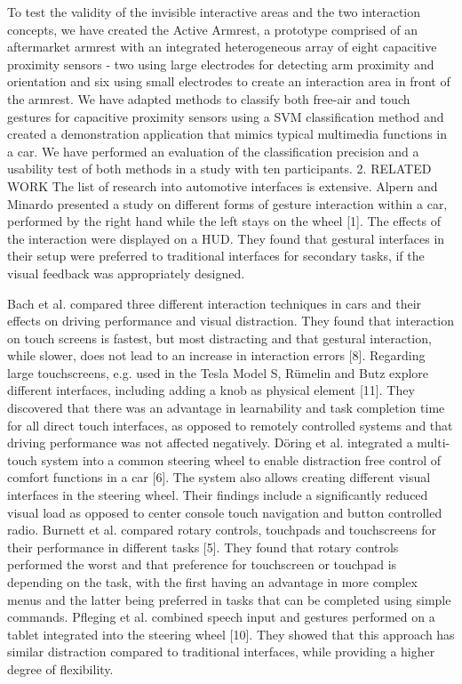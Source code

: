 To test the validity of the invisible interactive areas and the two interaction concepts, we have created the Active Armrest, a prototype comprised of an aftermarket armrest with an integrated heterogeneous array of eight capacitive proximity sensors - two using large electrodes for detecting arm proximity and orientation and six using small electrodes to create an interaction area in front of the armrest. We have adapted methods to classify both free-air and touch gestures for capacitive proximity sensors using a SVM classification method and created a demonstration application that mimics typical multimedia functions in a car. We have performed an evaluation of the classification precision and a usability test of both methods in a study with ten participants.
2.	RELATED WORK
The list of research into automotive interfaces is extensive. Alpern and Minardo presented a study on different forms of gesture interaction within a car, performed by the right hand while the left stays on the wheel [1]. The effects of the interaction were displayed on a HUD. They found that gestural interfaces in their setup were preferred to traditional interfaces for secondary tasks, if the visual feedback was appropriately designed.

Bach et al. compared three different interaction techniques in cars and their effects on driving performance and visual distraction. They found that interaction on touch screens is fastest, but most distracting and that gestural interaction, while slower, does not lead to an increase in interaction errors [8].
Regarding large touchscreens, e.g. used in the Tesla Model S, Rümelin and Butz explore different interfaces, including adding a knob as physical element [11]. They discovered that there was an advantage in learnability and task completion time for all direct touch interfaces, as opposed to remotely controlled systems and that driving performance was not affected negatively.
Döring et al. integrated a multi-touch system into a common steering wheel to enable distraction free control of comfort functions in a car [6]. The system also allows creating different visual interfaces in the steering wheel. Their findings include a significantly reduced visual load as opposed to center console touch navigation and button controlled radio.
Burnett et al. compared rotary controls, touchpads and touchscreens for their performance in different tasks [5]. They found that rotary controls performed the worst and that preference for touchscreen or touchpad is depending on the task, with the first having an advantage in more complex menus and the latter being preferred in tasks that can be completed using simple commands.
Pfleging et al. combined speech input and gestures performed on a tablet integrated into the steering wheel [10]. They showed that this approach has similar distraction compared to traditional interfaces, while providing a higher degree of flexibility.


